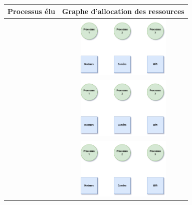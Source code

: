 \documentclass[12pt,a4paper,article,english,firamath]{nsi}
\newcommand{\truc}{4.5cm}
\begin{document}
\LARGE
\begin{center}
\begin{tabular}{|c|c|}
\hline
\rowcolor{UGLiOrange}\textbf{\color{white}Processus élu} & \textbf{\color{white}Graphe d'allocation des ressources} \\
\hline
 & \includegraphics[width=\truc]{img/d6.png} \\
\hline
 & \includegraphics[width=\truc]{img/d6.png} \\
\hline
 & \includegraphics[width=\truc]{img/d6.png} \\

\end{tabular}
\end{center}
\end{document}

